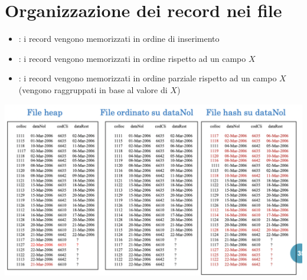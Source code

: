 \documentclass[12pt, a4paper]{report}
\begin{document}
    \section{Organizzazione dei record nei file}
    \begin{itemize}
        \item {}: i record vengono memorizzati in ordine di inserimento
        \item {}: i record vengono memorizzati in ordine rispetto ad un campo $X$
        \item {}: i record vengono memorizzati in ordine parziale rispetto ad un campo $X$ (vengono raggruppati in base al valore di $X$)
    \end{itemize}
    \begin{center}
        \includegraphics[scale=0.4]{Appunti Latex/Immagini/recordfile.png}
    \end{center}
\end{document}
